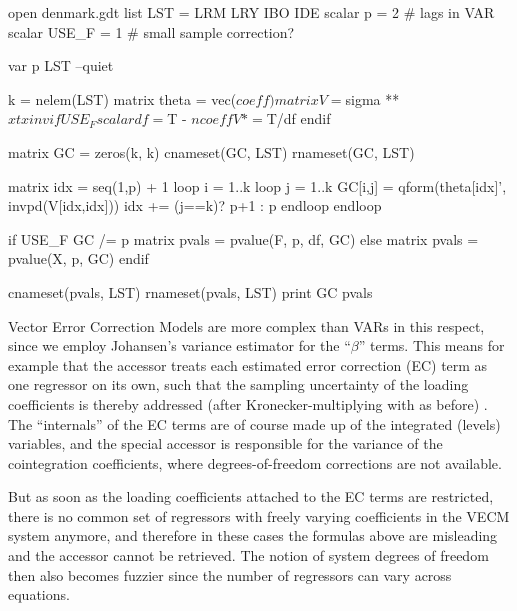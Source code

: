 \begin{script}[htbp]
  \label{GCtest}
\begin{scode}
open denmark.gdt
list LST = LRM LRY IBO IDE
scalar p = 2 # lags in VAR
scalar USE_F = 1 # small sample correction?

var p LST --quiet

k = nelem(LST)
matrix theta = vec($coeff)
matrix V = $sigma ** $xtxinv
if USE_F
  scalar df = $T - $ncoeff
  V *= $T/df
endif

matrix GC = zeros(k, k)
cnameset(GC, LST)
rnameset(GC, LST)

matrix idx = seq(1,p) + 1
loop i = 1..k
  loop j = 1..k
    GC[i,j] = qform(theta[idx]', invpd(V[idx,idx]))
    idx += (j==k)? p+1 : p
  endloop
endloop

if USE_F
  GC /= p
  matrix pvals = pvalue(F, p, df, GC)
else
  matrix pvals = pvalue(X, p, GC)
endif

cnameset(pvals, LST)
rnameset(pvals, LST)
print GC pvals
\end{scode}
\end{script}

Vector Error Correction Models are more complex than VARs in this
respect, since we employ Johansen's variance estimator for the
``$\beta$'' terms. 
This means for example that the  accessor treats each estimated 
error correction (EC) term as one regressor on its own, such that the sampling uncertainty
of the loading coefficients is thereby addressed (after Kronecker-multiplying with 
 as before) . The ``internals'' of the EC terms
are of course made up of the integrated (levels) variables, and the special
 accessor is responsible for the variance of the cointegration coefficients,
where degrees-of-freedom corrections are not available. 

But as soon as the loading coefficients attached to the EC terms are restricted, there is 
no common set of regressors with freely varying coefficients in the VECM system anymore,
and therefore in these cases the formulas above are misleading and the  
accessor cannot be retrieved. The notion of system degrees 
of freedom then also becomes fuzzier since the number of regressors can vary across 
equations.

